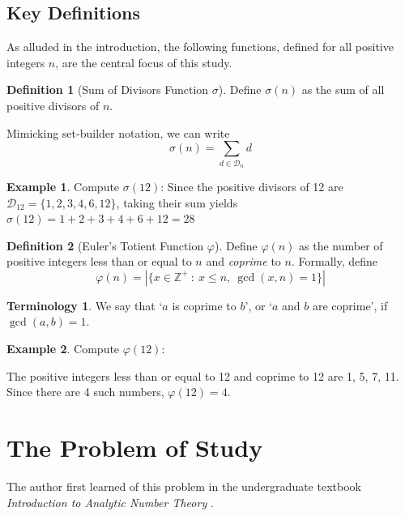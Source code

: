 \documentclass[a4paper, 12pt]{article}
\theoremstyle{definition}
\newtheorem{definition}{Definition}
\newtheorem{example}{Example}
\newtheorem*{terminology}{Terminology}
\begin{document}
\subsection{Key Definitions}
As alluded in the introduction, the following functions, defined for all positive integers $n$, are the central focus of this study.

\begin{definition}[Sum of Divisors Function $\sigma$]\label{def:sigma}
  Define $\sigma(n)$ as the sum of all positive divisors of $n$.

  Mimicking set-builder notation, we can write
  \begin{equation}\label{eq:sigma}
    \sigma(n) = \sum_{d \in \mathcal{D}_n} d
  \end{equation}
\end{definition}

\begin{example}
  Compute $\sigma(12)$:
  Since the positive divisors of 12 are $\mathcal{D}_{12}=\{1, 2, 3, 4, 6, 12\}$,
  taking their sum yields $\sigma(12)=1+2+3+4+6+12=28$
\end{example}

\vspace{1em}\begin{definition}[Euler's Totient Function $\varphi$]\label{def:totient}
  Define $\varphi(n)$ as the number of positive integers less than or equal to $n$ and \textit{coprime} to $n$.
  Formally, define
  \begin{equation}\label{eq:totient}
    \varphi(n) = \left|\{x\in \mathbb{Z}^+\ :\ x\leq n,\ \gcd(x,n)=1\}\right|
  \end{equation}
\end{definition}
\begin{terminology}
  We say that `$a$ is coprime to $b$', or `$a$ and $b$ are coprime', if $\gcd(a,b)=1$.
\end{terminology}\vspace{1em}

\begin{example}
  Compute $\varphi(12)$:

  \noindent The positive integers less than or equal to 12 and coprime to 12 are 1, 5, 7, 11.
  Since there are 4 such numbers, $\varphi(12)=4$.
\end{example}

\newpage

\section{The Problem of Study}
The author first learned of this problem in the undergraduate textbook \textit{Introduction to Analytic Number Theory} \cite{apostol}.
\end{document}

